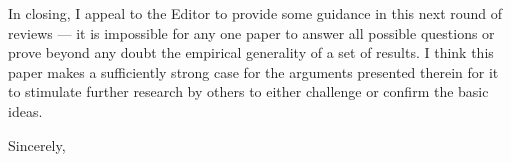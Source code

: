 \documentclass [11pt]{letter}
\begin{document}
\begin{letter}
In closing, I appeal to the Editor to provide some guidance in this
next round of reviews --- it is impossible for any one paper to answer
all possible questions or prove beyond any doubt the empirical
generality of a set of results.  I think this paper makes a
sufficiently strong case for the arguments presented therein for it to
stimulate further research by others to either challenge or confirm
the basic ideas.

\closing{Sincerely,}

\end{letter}
\end{document}
